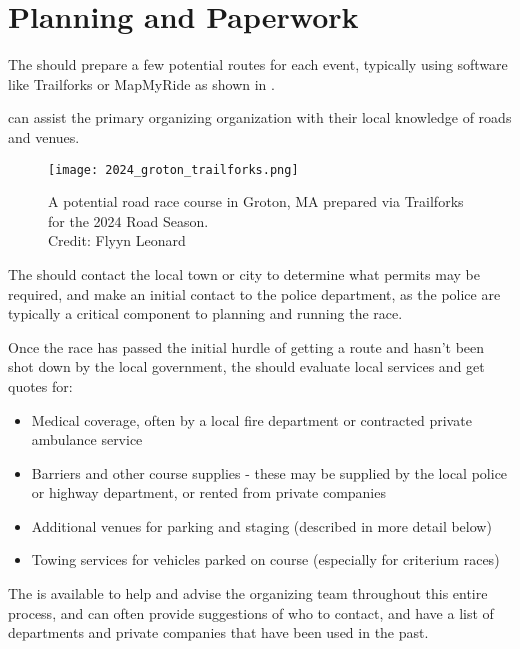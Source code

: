\section{Planning and Paperwork}

The  should prepare a few potential routes for each event,
typically using software like Trailforks or MapMyRide as shown in .

 can assist the primary organizing organization with their local knowledge of roads and venues.

\begin{figure}[h]
  \texttt{[image: 2024\_groton\_trailforks.png]}
  \caption[Road race course map in Trailforks]{
    A potential road race course in Groton, MA
    prepared via Trailforks for the 2024 Road Season.\\
    Credit: Flyyn Leonard}
\end{figure}


The  should contact the local town or city
to determine what permits may be required, and make an initial contact to the police department,
as the police are typically a critical component to planning and running the race.

Once the race has passed the initial hurdle of getting a route and hasn't been shot down by the local government,
the  should evaluate local services and get quotes for:

\begin{itemize}
  \item Medical coverage, often by a local fire department or contracted private ambulance service
  \item Barriers and other course supplies - these may be supplied by the local police or highway department, or rented from private companies
  \item Additional venues for parking and staging (described in more detail below)
  \item Towing services for vehicles parked on course (especially for criterium races)
\end{itemize}

The  is available to help and advise the organizing team throughout this entire process,
and can often provide suggestions of who to contact, and have a list of departments and private companies that have been used in the past.

